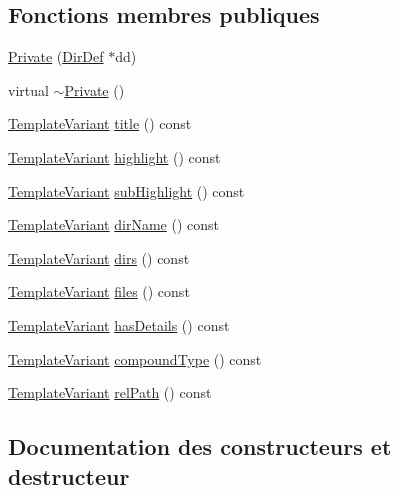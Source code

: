 \subsection*{Fonctions membres publiques}
\begin{DoxyCompactItemize}
\item 
\hyperlink{class_dir_context_1_1_private_a0b86ff8372531fb45977535e7d5a9c75}{Private} (\hyperlink{class_dir_def}{Dir\+Def} $\ast$dd)
\item 
virtual \hyperlink{class_dir_context_1_1_private_a87be3c111cf477fe37fc0537ea01b0e4}{$\sim$\+Private} ()
\item 
\hyperlink{class_template_variant}{Template\+Variant} \hyperlink{class_dir_context_1_1_private_aeeda8db2e9703cdef06edbd03f80bafb}{title} () const 
\item 
\hyperlink{class_template_variant}{Template\+Variant} \hyperlink{class_dir_context_1_1_private_ac01abb8ba6c0249f1c685875d7e49111}{highlight} () const 
\item 
\hyperlink{class_template_variant}{Template\+Variant} \hyperlink{class_dir_context_1_1_private_a413a3bf713d557469e7490ce32d5a22b}{sub\+Highlight} () const 
\item 
\hyperlink{class_template_variant}{Template\+Variant} \hyperlink{class_dir_context_1_1_private_aea5b7c7f0a11c8346cc48049deb943a1}{dir\+Name} () const 
\item 
\hyperlink{class_template_variant}{Template\+Variant} \hyperlink{class_dir_context_1_1_private_a8f7a276fae6dd9cdaf51cb53d194e6f1}{dirs} () const 
\item 
\hyperlink{class_template_variant}{Template\+Variant} \hyperlink{class_dir_context_1_1_private_a45a10f9b47383cf679047f74655e9b94}{files} () const 
\item 
\hyperlink{class_template_variant}{Template\+Variant} \hyperlink{class_dir_context_1_1_private_a72254ae4b77fd039a72c28e19ca9095c}{has\+Details} () const 
\item 
\hyperlink{class_template_variant}{Template\+Variant} \hyperlink{class_dir_context_1_1_private_a1c4b6ac5ed2c81d0ef597520cdc75992}{compound\+Type} () const 
\item 
\hyperlink{class_template_variant}{Template\+Variant} \hyperlink{class_dir_context_1_1_private_a67dd9bd436de59eb97b706682423403f}{rel\+Path} () const 
\end{DoxyCompactItemize}


\subsection{Documentation des constructeurs et destructeur}
\hypertarget{class_dir_context_1_1_private_a0b86ff8372531fb45977535e7d5a9c75}{}
